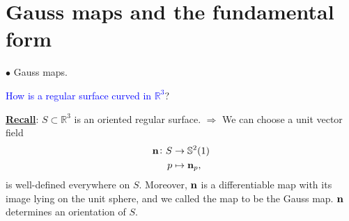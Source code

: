 \section{Gauss maps and the \texorpdfstring{}{2nd} fundamental form}
\(\bullet\) Gauss maps.
\begin{question}
    \textcolor{blue}{How is a regular surface curved in \(\mathbb{R}^3\)}? 
\end{question}
\underline{\textbf{Recall}}: \(S\subset\mathbb{R}^3\) is an oriented
regular surface. 
\(\Rightarrow\) We can choose a unit vector field 
    \begin{align*}
        \vb{n}\colon S&\to \mathbb{S}^2(1)\\
        p&\mapsto \vb{n}_p,
    \end{align*}
is well-defined everywhere on \(S\). Moreover, \(\vb{n}\) is a
differentiable map with its image lying on the unit sphere, and we 
called the map to be the Gauss map. \(\vb{n}\) determines an 
orientation of \(S\).
